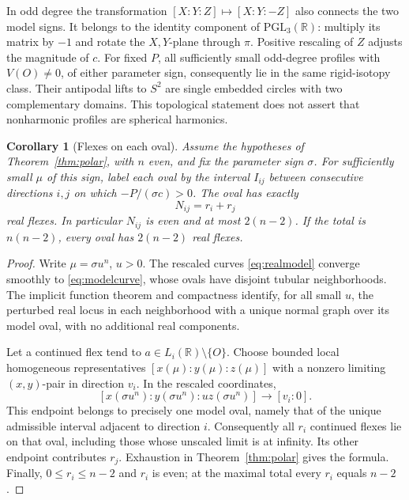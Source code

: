 \documentclass[11pt,a4paper]{article}
\newtheorem{corollary}[theorem]{Corollary}
\theoremstyle{remark}
\newcommand{\R}{\mathbb R}
\begin{document}
In odd degree the transformation \([X:Y:Z]\mapsto[X:Y:-Z]\)
also connects the two model signs. It belongs to the identity
component of \(\mathrm{PGL}_3(\R)\): multiply its matrix by
\(-1\) and rotate the \(X,Y\)-plane through \(\pi\).
Positive rescaling of \(Z\) adjusts the magnitude of \(c\).
For fixed \(P\), all sufficiently small odd-degree profiles
with \(V(O)\ne0\), of either parameter sign, consequently lie
in the same rigid-isotopy class. Their antipodal lifts to \(S^2\)
are single embedded circles with two complementary domains.
This topological statement does not assert that nonharmonic
profiles are spherical harmonics.

\begin{corollary}[Flexes on each oval]\label{cor:ovalcount}
Assume the hypotheses of Theorem~\ref{thm:polar}, with \(n\)
even, and fix the parameter sign \(\sigma\). For sufficiently
small \(\mu\) of this sign, label each oval by the interval
\(I_{ij}\) between consecutive directions \(i,j\) on which
\(-P/(\sigma c)>0\). The oval has exactly
\[
                              N_{ij}=r_i+r_j
\]
real flexes. In particular \(N_{ij}\) is even and at most
\(2(n-2)\). If the total is \(n(n-2)\), every oval has
\(2(n-2)\) real flexes.
\end{corollary}

\begin{proof}
Write \(\mu=\sigma u^n\), \(u>0\). The rescaled curves
\eqref{eq:realmodel} converge smoothly to
\eqref{eq:modelcurve}, whose ovals have disjoint tubular
neighborhoods. The implicit function theorem and compactness
identify, for all small \(u\), the perturbed real locus
in each neighborhood with a unique normal graph over its
model oval, with no additional real components.

Let a continued flex tend to \(a\in L_i(\R)\setminus\{O\}\).
Choose bounded local homogeneous representatives
\([x(\mu):y(\mu):z(\mu)]\) with a nonzero limiting
\((x,y)\)-pair in direction \(v_i\). In the rescaled coordinates,
\[
 [x(\sigma u^n):y(\sigma u^n):u z(\sigma u^n)]
                      \longrightarrow [v_i:0].
\]
This endpoint belongs to precisely one model oval, namely that
of the unique admissible interval adjacent to direction \(i\).
Consequently all \(r_i\) continued flexes lie on that oval,
including those whose unscaled limit is at infinity.
Its other endpoint contributes \(r_j\). Exhaustion in
Theorem~\ref{thm:polar} gives the formula. Finally,
\(0\leq r_i\leq n-2\) and \(r_i\) is even; at the maximal
total every \(r_i\) equals \(n-2\).
\end{proof}
\end{document}
